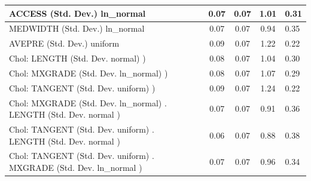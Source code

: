 \begin{table}
\begin{center}
\begin{tabular}{|l|l|c|c|c|l|}
			\hline
			ACCESS (Std. Dev.) ln_normal &  & 0.07 & 0.07 & 1.01 & 0.31 \\
			\hline
			MEDWIDTH (Std. Dev.) ln_normal &  & 0.07 & 0.07 & 0.94 & 0.35 \\
			\hline
			AVEPRE (Std. Dev.) uniform &  & 0.09 & 0.07 & 1.22 & 0.22 \\
			\hline
			 Chol: LENGTH (Std. Dev. normal) ) &  & 0.08 & 0.07 & 1.04 & 0.30 \\
			\hline
			 Chol: MXGRADE (Std. Dev. ln_normal) ) &  & 0.08 & 0.07 & 1.07 & 0.29 \\
			\hline
			 Chol: TANGENT (Std. Dev. uniform) ) &  & 0.09 & 0.07 & 1.24 & 0.22 \\
			\hline
			 Chol: MXGRADE (Std. Dev. ln_normal) . LENGTH (Std. Dev.   normal ) &  & 0.07 & 0.07 & 0.91 & 0.36 \\
			\hline
			 Chol: TANGENT (Std. Dev. uniform) . LENGTH (Std. Dev.   normal ) &  & 0.06 & 0.07 & 0.88 & 0.38 \\
			\hline
			 Chol: TANGENT (Std. Dev. uniform) . MXGRADE (Std. Dev.   ln_normal ) &  & 0.07 & 0.07 & 0.96 & 0.34 \\
			\hline
		\end{tabular}
	\end{center}
\end{table}